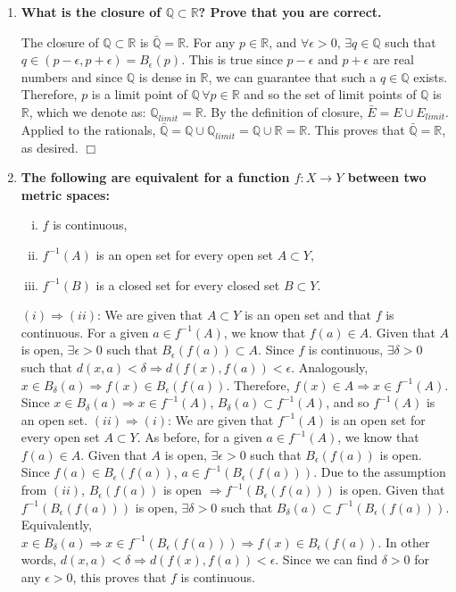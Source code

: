 \documentclass[5pt,letterpaper,reqno]{amsart}
\newcommand{\R}{\mathbb R}
\newcommand{\Q}{\mathbb Q}
\begin{document}
\begin{enumerate}[1.]
\begin{flushleft}
\end{flushleft}
\item \textbf{What is the closure of $\Q\subset \R$? Prove that you are correct.}
\begin{flushleft}
    The closure of $\Q\subset \R$ is $\bar{\Q} = \R$. For any $p \in \R$, and $\forall \epsilon > 0$, $\exists q \in \Q$ such that $q \in (p-\epsilon,p+\epsilon) = B_\epsilon(p)$. This is true since $p-\epsilon$ and $p+\epsilon$ are real numbers and since $\Q$ is dense in $\R$, we can guarantee that such a $q \in \Q$ exists. Therefore, $p$ is a limit point of $\Q \, \forall p \in \R$ and so the set of limit points of $\Q$ is $\R$, which we denote as: $\Q_{limit} = \R$. By the definition of closure, $\bar{E} = E \cup E_{limit}$. Applied to the rationals, $\bar{\Q} = \Q \cup \Q_{limit} = \Q \cup \R = \R$. This proves that $\bar{\Q} = \R$, as desired. $\Box$
\end{flushleft}
\item \textbf{The following are equivalent for a function $f: X\rightarrow Y$ between two metric spaces:}
\begin{enumerate}[(i)]
\item $f$ is continuous,
\item $f^{-1}(A)$ is an open set for every open set $A\subset Y$,
\item $f^{-1}(B)$ is a closed set for every closed set $B\subset Y$.
\end{enumerate}
\begin{flushleft}
    $(i) \Rightarrow (ii)$: We are given that $A \subset Y$ is an open set and that $f$ is continuous. For a given $a \in f^{-1}(A)$, we know that $f(a) \in A$. Given that $A$ is open, $\exists \epsilon > 0$ such that $B_\epsilon(f(a)) \subset A$. Since $f$ is continuous, $\exists \delta > 0$ such that $d(x,a) < \delta \Rightarrow d(f(x),f(a)) < \epsilon$. Analogously, $x \in B_\delta(a) \Rightarrow f(x) \in B_\epsilon(f(a))$. Therefore, $f(x) \in A \Rightarrow x \in f^{-1}(A)$. Since $x \in B_\delta(a) \Rightarrow x \in f^{-1}(A)$, $B_\delta(a) \subset f^{-1}(A)$, and so $f^{-1}(A)$ is an open set. \newline
$(ii) \Rightarrow (i)$: We are given that $f^{-1}(A)$ is an open set for every open set $A\subset Y$. As before, for a given $a \in f^{-1}(A)$, we know that $f(a) \in A$. Given that $A$ is open, $\exists \epsilon > 0$ such that $B_\epsilon(f(a))$ is open. Since $f(a) \in B_\epsilon(f(a))$, $a \in f^{-1}(B_\epsilon(f(a)))$. Due to the assumption from $(ii)$, $B_\epsilon(f(a))$ is open $\Rightarrow f^{-1}(B_\epsilon(f(a)))$ is open. Given that $ f^{-1}(B_\epsilon(f(a)))$ is open, $\exists \delta > 0$ such that $B_\delta(a) \subset f^{-1}(B_\epsilon(f(a)))$. Equivalently, $x \in B_\delta(a) \Rightarrow x \in f^{-1}(B_\epsilon(f(a))) \Rightarrow f(x) \in B_\epsilon(f(a))$. In other words, $d(x,a) < \delta \Rightarrow d(f(x),f(a)) < \epsilon$. Since we can find $\delta > 0$ for any $\epsilon > 0$, this proves that $f$ is continuous. \newline

\end{flushleft}
\end{enumerate}
\end{document}
